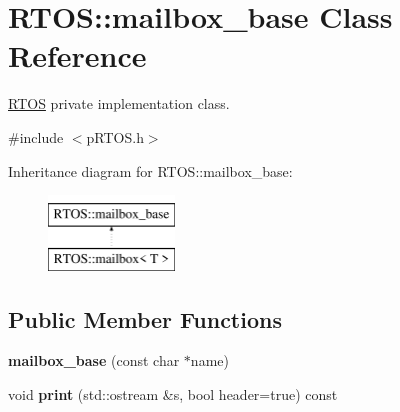 \hypertarget{class_r_t_o_s_1_1mailbox__base}{}\section{R\+T\+OS\+:\+:mailbox\+\_\+base Class Reference}
\label{class_r_t_o_s_1_1mailbox__base}


\hyperlink{class_r_t_o_s}{R\+T\+OS} private implementation class.  




{\ttfamily \#include $<$p\+R\+T\+O\+S.\+h$>$}

Inheritance diagram for R\+T\+OS\+:\+:mailbox\+\_\+base\+:\begin{figure}[H]
\begin{center}
\leavevmode
\includegraphics[height=2.000000cm]{class_r_t_o_s_1_1mailbox__base}
\end{center}
\end{figure}
\subsection*{Public Member Functions}
\begin{DoxyCompactItemize}
\item 
{\bfseries mailbox\+\_\+base} (const char $\ast$name)\hypertarget{class_r_t_o_s_1_1mailbox__base_a935d65de435dfbb9d567b461bf619259}{}\label{class_r_t_o_s_1_1mailbox__base_a935d65de435dfbb9d567b461bf619259}

\item 
void {\bfseries print} (std\+::ostream \&s, bool header=true) const \hypertarget{class_r_t_o_s_1_1mailbox__base_ac165beaf90a7c0de8434cb3158114525}{}\label{class_r_t_o_s_1_1mailbox__base_ac165beaf90a7c0de8434cb3158114525}

\end{DoxyCompactItemize}
